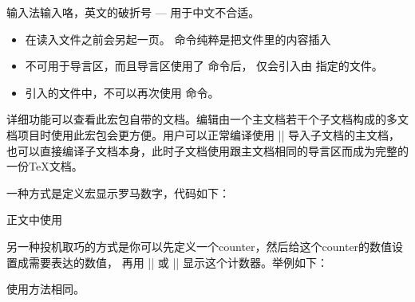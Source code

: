 
输入法输入咯，英文的破折号 --- 用于中文不合适。



\begin{itemize}
\item {} 在读入文件之前会另起一页。 命令纯粹是把文件里的内容插入
\item {} 不可用于导言区，而且导言区使用了  命令后，
   仅会引入由  指定的文件。
\item {} 引入的文件中，不可以再次使用  命令。
\end{itemize}



详细功能可以查看此宏包自带的文档。编辑由一个主文档若干个子文档构成的多文档项目时使用此宏包会更方便。用户可以正常编译使用
|| 导入子文档的主文档，也可以直接编译子文档本身，此时子文档使用跟主文档相同的导言区而成为完整的一份\TeX{}文档。

















一种方式是定义宏显示罗马数字，代码如下：
\begin{texlist}
  \newcommand{\Myroman}[1]{\romannumeral #1}
  \newcommand{\MyRoman}[1]{\expandafter\@slowromancap\romannumeral #1@}
\end{texlist}
正文中使用
\begin{texlist}
   
\end{texlist}

另一种投机取巧的方式是你可以先定义一个counter，然后给这个counter的数值设置成需要表达的数值，
再用 |\Roman| 或 |\roman| 显示这个计数器。举例如下：
\begin{texlist}
  \newcommand{\MyRoman}[1]{\setcounter{romannum}{#1}\Roman{romannum}}
  \newcommand{\Myroman}[1]{\setcounter{romannum}{#1}\roman{romannum}}
\end{texlist}
使用方法相同。


